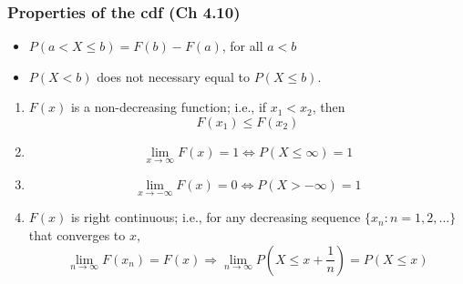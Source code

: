 \documentclass[slidestop,compress,mathserif]{beamer}
\begin{document}
\begin{frame}\frametitle{Properties of the cdf (Ch 4.10)}

\begin{itemize}
\item $P(a < X \leq b) = F(b) - F(a)$, for all $a<b$

\pause
\item $P(X < b)$ does not necessary equal to $P(X\leq b)$.
\end{itemize}

\pause
\begin{enumerate}
\item $F(x)$ is a non-decreasing function; i.e., if $x_1 < x_2$, then
\[F(x_1) \leq F(x_2)\]

\pause \vspace{-0.5cm}
\item \[ \lim_{x \rightarrow \infty} F(x) = 1 \Longleftrightarrow P(X \leq \infty) = 1\]

\pause \vspace{-0.5cm}
\item \[ \lim_{x \rightarrow -\infty} F(x) = 0 \Longleftrightarrow P(X > -\infty) = 1\]

\pause \vspace{-0.1cm}
\item $F(x)$ is right continuous; i.e., for any decreasing sequence $\{x_n: n = 1, 2, \ldots \}$ that converges to $x$,
\[ \lim_{n\rightarrow \infty}F(x_n) = F(x)\Longrightarrow \lim_{n\rightarrow \infty}P(X \leq x + \frac{1}{n}) = P(X \leq x)\]
\end{enumerate}


\end{frame}
\end{document}
